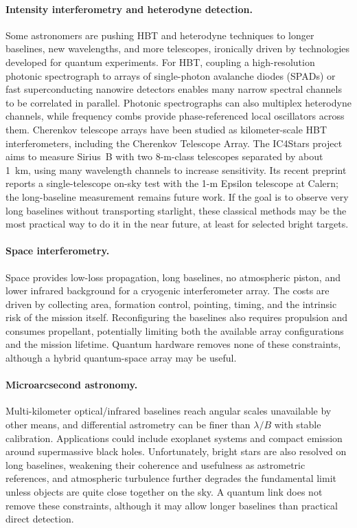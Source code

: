 \documentclass[]{spie}
\begin{document}
\paragraph{Intensity interferometry and heterodyne detection.}
Some astronomers are pushing HBT and heterodyne techniques to longer baselines, new wavelengths, and more telescopes, ironically driven by technologies developed for quantum experiments.
For HBT, coupling a high-resolution photonic spectrograph to arrays of single-photon avalanche diodes (SPADs) or fast superconducting nanowire detectors enables many narrow spectral channels to be correlated in parallel. Photonic spectrographs can also multiplex heterodyne channels, while frequency combs provide phase-referenced local oscillators across them. Cherenkov telescope arrays have been studied as kilometer-scale HBT interferometers, including the Cherenkov Telescope Array.\cite{Dravins2013CTA} The IC4Stars project aims to measure Sirius~B with two 8-m-class telescopes separated by about 1~km, using many wavelength channels to increase sensitivity. Its recent preprint reports a single-telescope on-sky test with the 1-m Epsilon telescope at Calern; the long-baseline measurement remains future work.\cite{IzraelevitchPatitucci2026} If the goal is to observe very long baselines without transporting starlight, these classical methods may be the most practical way to do it in the near future, at least for selected bright targets.

\paragraph{Space interferometry.}
Space provides low-loss propagation, long baselines, no atmospheric piston, and lower infrared background for a cryogenic interferometer array. The costs are driven by collecting area, formation control, pointing, timing, and the intrinsic risk of the mission itself. Reconfiguring the baselines also requires propulsion and consumes propellant, potentially limiting both the available array configurations and the mission lifetime. Quantum hardware removes none of these constraints, although a hybrid quantum-space array may be useful.

\paragraph{Microarcsecond astronomy.}
Multi-kilometer optical/infrared baselines reach angular scales unavailable by other means, and differential astrometry can be finer than $\lambda/B$ with stable calibration. Applications could include exoplanet systems and compact emission around supermassive black holes. Unfortunately, bright stars are also resolved on long baselines, weakening their coherence and usefulness as astrometric references, and atmospheric turbulence\cite{shaocolavita} further degrades the fundamental limit unless objects are quite close together on the sky. A quantum link does not remove these constraints, although it may allow longer baselines than practical direct detection.
\end{document}

